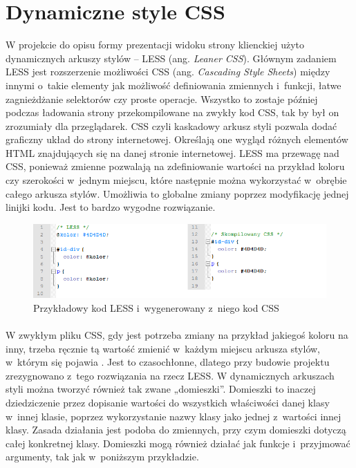 \section{Dynamiczne style CSS}
W projekcie do opisu formy prezentacji widoku strony klienckiej użyto dynamicznych arkuszy stylów – LESS (ang. \textit{Leaner CSS}). Głównym zadaniem LESS jest rozszerzenie możliwości CSS (ang. \textit{Cascading Style Sheets}) między innymi o~takie elementy jak możliwość definiowania zmiennych i~funkcji, łatwe zagnieżdżanie selektorów czy proste operacje. Wszystko to zostaje później podczas ładowania strony przekompilowane na zwykły kod CSS, tak by był on zrozumiały dla przeglądarek. CSS czyli kaskadowy arkusz styli pozwala dodać graficzny układ do strony internetowej. Określają one wygląd różnych elementów HTML znajdujących się na danej stronie internetowej. 
LESS ma przewagę nad CSS, ponieważ zmienne pozwalają na zdefiniowanie wartości na przykład koloru czy szerokości w~jednym miejscu, które następnie można wykorzystać w~obrębie całego arkusza stylów. Umożliwia to globalne zmiany poprzez modyfikację jednej linijki kodu. Jest to bardzo wygodne rozwiązanie. 

\begin{figure}[h]
	\centering
	\includegraphics[width=1.00\textwidth]{images/less1.png}
	\caption{Przykładowy kod LESS i~wygenerowany z~niego kod CSS}
\end{figure}
\paragraph{}
W zwykłym pliku CSS, gdy jest potrzeba zmiany na przykład jakiegoś koloru na inny, trzeba ręcznie tą wartość zmienić w~każdym miejscu arkusza stylów, w~którym się pojawia \cite{cssBook}. Jest to czasochłonne, dlatego przy budowie projektu zrezygnowano z~tego rozwiązania na rzecz LESS. 
W dynamicznych arkuszach styli można tworzyć również tak zwane „domieszki”. Domieszki to inaczej dziedziczenie przez dopisanie wartości do wszystkich właściwości danej klasy w~innej klasie, poprzez wykorzystanie nazwy klasy jako jednej z~wartości innej klasy. Zasada działania jest podoba do zmiennych, przy czym domieszki dotyczą całej konkretnej klasy. Domieszki mogą również działać jak funkcje i~przyjmować argumenty, tak jak w~poniższym przykładzie.

